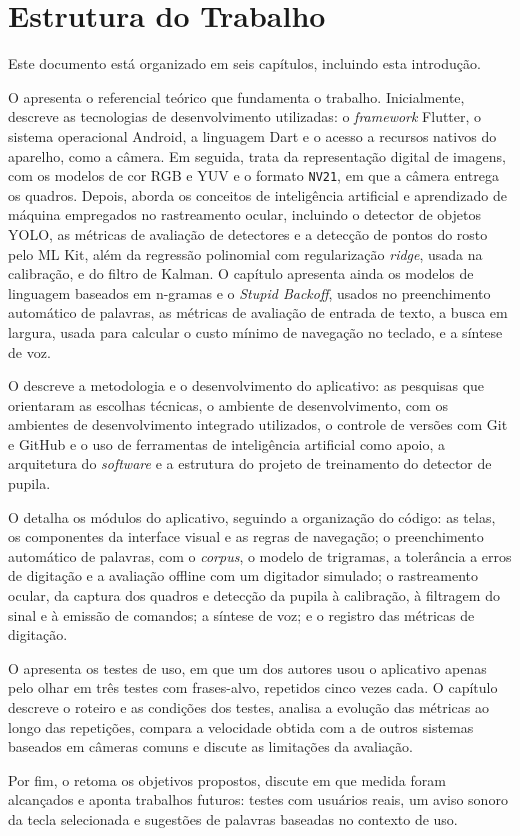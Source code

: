 \section{Estrutura do Trabalho} \label{sec:estrutura}

Este documento está organizado em seis capítulos, incluindo esta introdução.

O  apresenta o referencial teórico que fundamenta o trabalho. Inicialmente, descreve as tecnologias de desenvolvimento utilizadas: o \textit{framework} Flutter, o sistema operacional Android, a linguagem Dart e o acesso a recursos nativos do aparelho, como a câmera. Em seguida, trata da representação digital de imagens, com os modelos de cor RGB e YUV e o formato \texttt{NV21}, em que a câmera entrega os quadros. Depois, aborda os conceitos de inteligência artificial e aprendizado de máquina empregados no rastreamento ocular, incluindo o detector de objetos YOLO, as métricas de avaliação de detectores e a detecção de pontos do rosto pelo ML Kit, além da regressão polinomial com regularização \textit{ridge}, usada na calibração, e do filtro de Kalman. O capítulo apresenta ainda os modelos de linguagem baseados em n-gramas e o \textit{Stupid Backoff}, usados no preenchimento automático de palavras, as métricas de avaliação de entrada de texto, a busca em largura, usada para calcular o custo mínimo de navegação no teclado, e a síntese de voz.

O  descreve a metodologia e o desenvolvimento do aplicativo: as pesquisas que orientaram as escolhas técnicas, o ambiente de desenvolvimento, com os ambientes de desenvolvimento integrado utilizados, o controle de versões com Git e GitHub e o uso de ferramentas de inteligência artificial como apoio, a arquitetura do \textit{software} e a estrutura do projeto de treinamento do detector de pupila.

O  detalha os módulos do aplicativo, seguindo a organização do código: as telas, os componentes da interface visual e as regras de navegação; o preenchimento automático de palavras, com o \textit{corpus}, o modelo de trigramas, a tolerância a erros de digitação e a avaliação offline com um digitador simulado; o rastreamento ocular, da captura dos quadros e detecção da pupila à calibração, à filtragem do sinal e à emissão de comandos; a síntese de voz; e o registro das métricas de digitação.

O  apresenta os testes de uso, em que um dos autores usou o aplicativo apenas pelo olhar em três testes com frases-alvo, repetidos cinco vezes cada. O capítulo descreve o roteiro e as condições dos testes, analisa a evolução das métricas ao longo das repetições, compara a velocidade obtida com a de outros sistemas baseados em câmeras comuns e discute as limitações da avaliação.

Por fim, o  retoma os objetivos propostos, discute em que medida foram alcançados e aponta trabalhos futuros: testes com usuários reais, um aviso sonoro da tecla selecionada e sugestões de palavras baseadas no contexto de uso.
